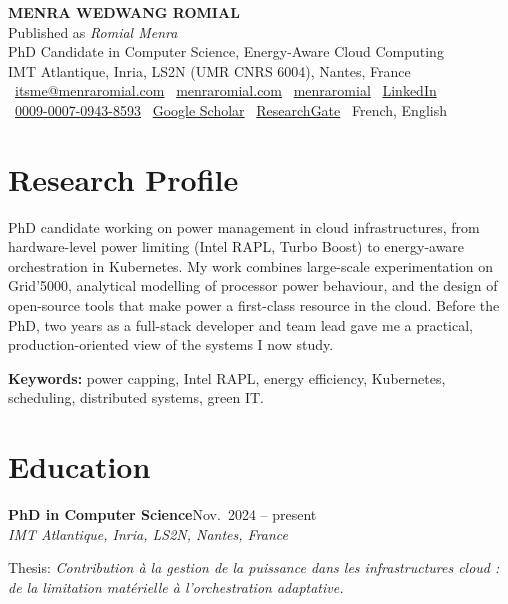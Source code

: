 \documentclass[10pt,a4paper]{article}
\newcommand{\entry}[3]{%
  \textbf{#1}\hfill{\color{muted}#2}\\
  {\color{muted}\itshape #3}\par\vspace{0.2ex}}
\newcommand{\link}[2]{\href{#1}{{\color{accent}#2}}}
\begin{document}
\begin{center}
  {\LARGE\bfseries MENRA WEDWANG ROMIAL}\\[0.4ex]
  {\color{muted} Published as \emph{Romial Menra}}\\[0.8ex]
  {\large PhD Candidate in Computer Science, Energy-Aware Cloud Computing}\\[0.3ex]
  {\color{muted} IMT Atlantique, Inria, LS2N (UMR CNRS 6004), Nantes, France}\\[1ex]
  \small
  \faEnvelope\ \link{mailto:itsme@menraromial.com}{itsme@menraromial.com}\quad
  \faGlobe\ \link{https://menraromial.com}{menraromial.com}\quad
  \faGithub\ \link{https://github.com/menraromial}{menraromial}\quad
  \faLinkedin\ \link{https://www.linkedin.com/in/menraromial}{LinkedIn}\\[0.4ex]
  \faOrcid\ \link{https://orcid.org/0009-0007-0943-8593}{0009-0007-0943-8593}\quad
  \faGraduationCap\ \link{https://scholar.google.com/citations?user=M2nDshIAAAAJ}{Google Scholar}\quad
  \faResearchgate\ \link{https://www.researchgate.net/profile/Romial-Menra}{ResearchGate}\quad
  \faLanguage\ French, English
\end{center}

\section{Research Profile}
PhD candidate working on power management in cloud infrastructures, from hardware-level
power limiting (Intel RAPL, Turbo Boost) to energy-aware orchestration in Kubernetes. My
work combines large-scale experimentation on Grid'5000, analytical modelling of processor
power behaviour, and the design of open-source tools that make power a first-class resource
in the cloud. Before the PhD, two years as a full-stack developer and team lead gave me a
practical, production-oriented view of the systems I now study.

\textbf{Keywords:} power capping, Intel RAPL, energy efficiency, Kubernetes, scheduling,
distributed systems, green IT.

\section{Education}
\entry{PhD in Computer Science}{Nov.\ 2024 -- present}{IMT Atlantique, Inria, LS2N, Nantes, France}
Thesis: \emph{Contribution à la gestion de la puissance dans les infrastructures cloud :
de la limitation matérielle à l'orchestration adaptative.}
\vspace{1ex}
\end{document}
